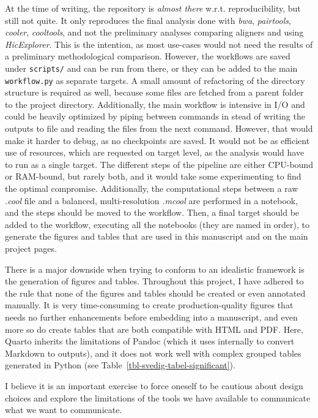 \documentclass[
  11pt,
  a4paper,
]{scrbook}
\let\oldemph\emph
\renewcommand\emph[1]{\oldemph{\color{gray}#1}}
\begin{document}
At the time of writing, the repository is \emph{almost there} w.r.t.
reproducibility, but still not quite. It only reproduces the final
analysis done with \emph{bwa}, \emph{pairtools}, \emph{cooler},
\emph{cooltools}, and not the preliminary analyses comparing aligners
and using \emph{HicExplorer}. This is the intention, as most use-cases
would not need the results of a preliminary methodological comparison.
However, the workflows are saved under \texttt{scripts/} and can be run
from there, or they can be added to the main \texttt{workflow.py} as
separate targets. A small amount of refactoring of the directory
structure is required as well, because some files are fetched from a
parent folder to the project directory. Additionally, the main workflow
is intensive in I/O and could be heavily optimized by piping between
commands in stead of writing the outputs to file and reading the files
from the next command. However, that would make it harder to debug, as
no checkpoints are saved. It would not be as efficient use of resources,
which are requested on target level, as the analysis would have to run
as a single target. The different steps of the pipeline are either
CPU-bound or RAM-bound, but rarely both, and it would take some
experimenting to find the optimal compromise. Additionally, the
computational steps between a raw \emph{.cool} file and a balanced,
multi-resolution \emph{.mcool} are performed in a notebook, and the
steps should be moved to the workflow. Then, a final target should be
added to the workflow, executing all the notebooks (they are named in
order), to generate the figures and tables that are used in this
manuscript and on the main project pages.

There is a major downside when trying to conform to an idealistic
framework is the generation of figures and tables. Throughout this
project, I have adhered to the rule that none of the figures and tables
should be created or even annotated manually. It is very time-consuming
to create production-quality figures that needs no further enhancements
before embedding into a manuscript, and even more so do create tables
that are both compatible with HTML and PDF. Here, Quarto inherits the
limitations of Pandoc (which it uses internally to convert Markdown to
outputs), and it does not work well with complex grouped tables
generated in Python (see Table~\ref{tbl-svedig-tabel-significant}).

I believe it is an important exercise to force oneself to be cautious
about design choices and explore the limitations of the tools we have
available to communicate what we want to communicate.
\end{document}

